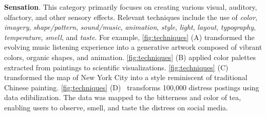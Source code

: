 \textbf{Sensation}. This category primarily focuses on creating various visual, auditory, olfactory, and other sensory effects. Relevant techniques include the use of \textit{color}, \textit{imagery}, \textit{shape/pattern}, \textit{sound/music}, \textit{animation}, \textit{style}, \textit{light}, \textit{layout}, \textit{typography}, \textit{temperature}, \textit{smell}, and \textit{taste}. 
For example, \autoref{fig:techniques} (A) transformed the evolving music listening experience into a generative artwork composed of vibrant colors, organic shapes, and animation.
\autoref{fig:techniques} (B) applied color palettes extracted from paintings to scientific visualizations.
\autoref{fig:techniques} (C) transformed the map of New York City into a style reminiscent of traditional Chinese painting.
\autoref{fig:techniques} (D)~\cite{li2023bitter} transforms 100,000 distress postings using data edibilization. The data was mapped to the bitterness and color of tea, enabling users to observe, smell, and taste the distress on social media.




